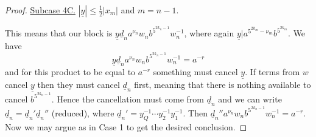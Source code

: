 \documentclass[10pt,a4paper]{amsart}
\newcommand{\pdt}{\underline}
\begin{document}
\begin{proof}
		\vskip 2mm
		\noindent
		\underline{Subcase 4C.} $|\pdt{y}| \leq \frac{1}{2}|x_m|$  and $m=n-1$.
		
		This means that our block is $\pdt{y}\pdt{d}_n a^{\nu_n} w_n b^{5^{2k_n-1}} w_n^{-1}$, where again  $\pdt{y} | a^{5^{2k_m} - \nu_m} b^{5^{2k_m}}$. 
		We have 
		$$\pdt{y} \pdt{d}_n a^{\nu_n} w_n b^{5^{2k_n-1}} w_n^{-1} = a^{-r}$$
		and for this product to be equal to $a^{-r}$ something must cancel $\pdt{y}$. If terms from $w$ cancel $\pdt{y}$ then they must cancel $\pdt{d}_n$ first, meaning that there is nothing available to cancel $b^{5^{2k_n-1}}$. 
		Hence the cancellation must come from $\pdt{d}_n$ and we can write $\pdt{d}_n = \pdt{d}_n' \pdt{d}_n''$ (reduced), 
		where $\pdt{d}_n' = y_Q^{-1}\cdots y_2^{-1} y_1^{-1}$. Then  $\pdt{d}_n'' a^{\nu_n} w_n b^{5^{2k_n-1}} w_n^{-1} = a^{-r}$. Now we may argue as in Case 1 to get the desired conclusion.
	\end{proof}
\end{document}

